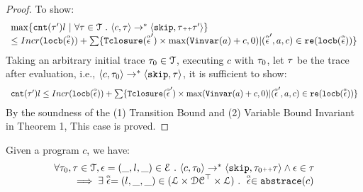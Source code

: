 \begin{proof}
To show:
\[
  \begin{array}{l}
    \max \left\{ \vcounter(\vtrace') l ~ \middle\vert~
\forall \vtrace \in \mathcal{T} \st \config{{c}, \trace} \to^{*} \config{\eskip, \trace\tracecat\vtrace'} \right\} 
\\
\leq 
Incr(\locbound(\absevent)) + 
\sum\{\absclr(\absevent') \times \max(\varinvar(a) + c, 0) | (\absevent', a, c) \in \reset(\locbound(\absevent))\} 
\end{array}
\]
  Taking an arbitrary initial trace
  $\mathtt{\tau}_0 \in \mathcal{T}$, 
  executing $c$ with $\mathtt{\tau}_0$, let $\mathtt{\tau}$ be the trace after evaluation, i.e., $\langle {c}, \mathtt{\tau}_0 \rangle \to^{*} \langle \mathtt{skip},\mathtt{\tau} \rangle$, it is sufficient to show:
  \[ 
    \begin{array}{l}
      \mathtt{cnt}(\mathtt{\tau}') l \leq 
    Incr(\mathtt{locb}(\stackrel{\scriptscriptstyle{\alpha}}{\mathtt{\epsilon}{}})) + 
    \sum\{{\mathtt{Tclosure}}(\stackrel{\scriptscriptstyle{\alpha}}{\mathtt{\epsilon}{}}') \times \max({\mathtt{Vinvar}}(a) + c, 0) | (\stackrel{\scriptscriptstyle{\alpha}}{\mathtt{\epsilon}{}}', a, c) \in \mathtt{re}(\mathtt{locb}(\stackrel{\scriptscriptstyle{\alpha}}{\mathtt{\epsilon}{}}))\}
  \end{array}
  \]
%
 By the soundness of the (1) Transition Bound and (2) Variable Bound Invariant 
 in \cite{sinn2017complexity} Theorem 1, 
This case is proved.
\end{proof}
\begin{lem}
  \label{lem:abscfg_sound}
Given a program ${c}$, we have:
%
\[
  \begin{array}{l}
    \forall \mathtt{\tau}_0, \mathtt{\tau} \in \mathcal{T} ,  \mathtt{\epsilon} = (\_, l, \_) \in \mathcal{E} ~.~
\langle {c}, \mathtt{\tau}_0 \rangle \to^{*} \langle \mathtt{skip}, \mathtt{\tau}_0 {\scriptscriptstyle ++} \mathtt{\tau} \rangle 
\land \mathtt{\epsilon} \in \mathtt{\tau} 
\\
\qquad \implies \exists \stackrel{\scriptscriptstyle{\alpha}}{\mathtt{\epsilon}{}} = (l, \_, \_) \in (\mathcal{L}\times \mathcal{DC}^{\top} \times \mathcal{L}) ~.~ 
\stackrel{\scriptscriptstyle{\alpha}}{\mathtt{\epsilon}{}} \in \mathtt{abs}{\mathtt{trace}}(c)
\end{array}
\]
\end{lem}
